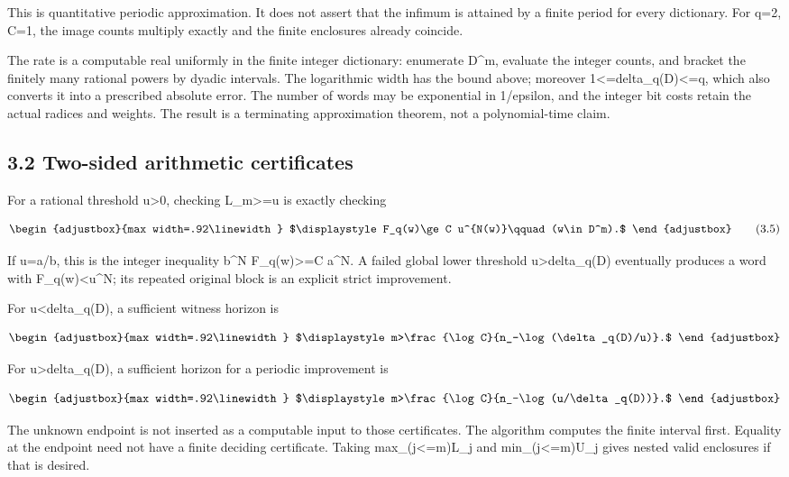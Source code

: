 This is quantitative periodic approximation. It does not assert that the infimum is attained by a finite period for every dictionary. For q=2, C=1, the image counts multiply exactly and the finite enclosures already coincide.

The rate is a computable real uniformly in the finite integer dictionary: enumerate D\^{}m, evaluate the integer counts, and bracket the finitely many rational powers by dyadic intervals. The logarithmic width has the bound above; moreover 1\textless=delta\_q(D)\textless=q, which also converts it into a prescribed absolute error. The number of words may be exponential in 1/epsilon, and the integer bit costs retain the actual radices and weights. The result is a terminating approximation theorem, not a polynomial-time claim.

\subsection{3.2 Two-sided arithmetic certificates}\label{n28-two-sided-arithmetic-certificates}

For a rational threshold u\textgreater0, checking L\_m\textgreater=u is exactly checking

\[
\begin{adjustbox}{max width=.92\linewidth}
$\displaystyle F_q(w)\ge C u^{N(w)}\qquad(w\in D^m).$
\end{adjustbox}
\tag{3.5}
\]

If u=a/b, this is the integer inequality b\^{}N F\_q(w)\textgreater=C a\^{}N. A failed global lower threshold u\textgreater delta\_q(D) eventually produces a word with F\_q(w)\textless u\^{}N; its repeated original block is an explicit strict improvement.

For u\textless delta\_q(D), a sufficient witness horizon is

\[
\begin{adjustbox}{max width=.92\linewidth}
$\displaystyle m>\frac{\log C}{n_-\log(\delta_q(D)/u)}.$
\end{adjustbox}
\]

For u\textgreater delta\_q(D), a sufficient horizon for a periodic improvement is

\[
\begin{adjustbox}{max width=.92\linewidth}
$\displaystyle m>\frac{\log C}{n_-\log(u/\delta_q(D))}.$
\end{adjustbox}
\]

The unknown endpoint is not inserted as a computable input to those certificates. The algorithm computes the finite interval first. Equality at the endpoint need not have a finite deciding certificate. Taking max\_(j\textless=m)L\_j and min\_(j\textless=m)U\_j gives nested valid enclosures if that is desired.

